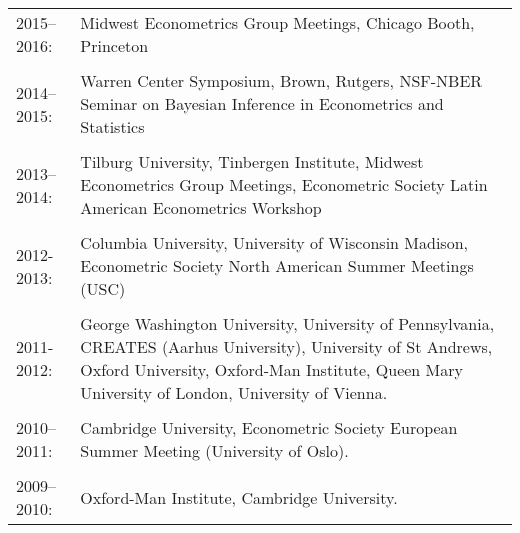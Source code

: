 \documentclass[line,overlapped]{myres}
\begin{document}
\begin{resume}
\begin{tabular}{p{2cm}p{12cm}}
2015--2016: & Midwest Econometrics Group Meetings, Chicago Booth, Princeton\\ \\
2014--2015: & Warren Center Symposium, Brown, Rutgers, NSF-NBER Seminar on Bayesian Inference in Econometrics and Statistics \\ \\
2013--2014: & Tilburg University, Tinbergen Institute, Midwest Econometrics Group Meetings, Econometric Society Latin American Econometrics Workshop\\ \\
2012-2013: & Columbia University, University of Wisconsin Madison, Econometric Society North American Summer Meetings (USC) \\\\
2011-2012: &  George Washington University, University of Pennsylvania, CREATES (Aarhus University), University of St Andrews, Oxford University, Oxford-Man Institute, Queen Mary University of London, University of Vienna. \\\\

2010--2011: &Cambridge University, Econometric Society European Summer Meeting (University of Oslo).\\\\

2009--2010: &Oxford-Man Institute, Cambridge University.
\end{tabular}



\end{resume}
\end{document}
